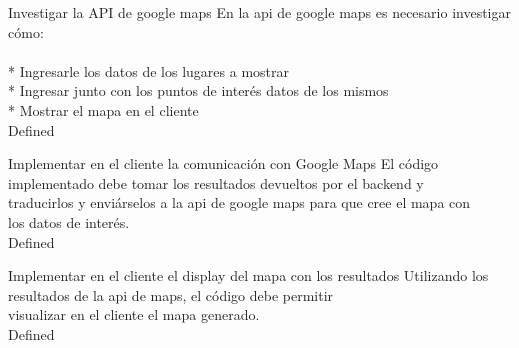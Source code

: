 		{Investigar la API de google maps} %
		{En la api de google maps es necesario investigar cómo:\\
  \\
* Ingresarle los datos de los lugares a mostrar\\
* Ingresar junto con los puntos de interés datos de los mismos\\
* Mostrar el mapa en el cliente\\
} %
		{} %
		{} %
		{} %
		{Defined} %

		{Implementar en el cliente la comunicación con Google Maps} %
		{El código implementado debe tomar los resultados devueltos por el backend y\\
traducirlos y enviárselos a la api de google maps para que cree el mapa con\\
los datos de interés.\\
} %
		{} %
		{} %
		{} %
		{Defined} %

		{Implementar en el cliente el display del mapa con los resultados} %
		{Utilizando los resultados de la api de maps, el código debe permitir\\
visualizar en el cliente el mapa generado.\\
} %
		{} %
		{} %
		{} %
		{Defined} %


\vspace{20pt}

